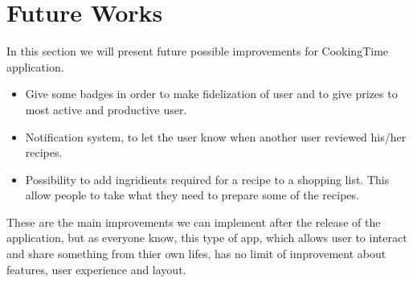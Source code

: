 \chapter{Future Works}
In this section we will present future possible improvements for CookingTime application.
\begin{itemize}
	\item Give some badges in order to make fidelization of user and to give prizes to most active and productive user.
	\item Notification system, to let the user know when another user reviewed his/her recipes. 
	\item Possibility to add ingridients required for a recipe to a shopping list. This allow people to take what they need to prepare some of the recipes.
\end{itemize}
These are the main improvements we can implement after the release of the application, but as everyone know, this type of app, which allows user to interact and share something from thier own lifes, has no limit of improvement about features, user experience and layout.